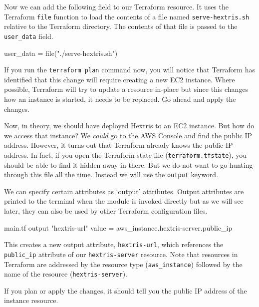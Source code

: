 \documentclass{csse4400}
\begin{document}


Now we can add the following field to our Terraform resource.
It uses the Terraform \texttt{file} function to load the contents of a file named \texttt{serve-hextris.sh} relative to the Terraform directory.
The contents of that file is passed to the \texttt{user\_data} field.

\begin{code}[language=terraform,numbers=none]{}
user_data = file("./serve-hextris.sh")
\end{code}

If you run the \texttt{terraform plan} command now,
you will notice that Terraform has identified that this change will require creating a new EC2 instance.
Where possible, Terraform will try to update a resource in-place but since this changes how an instance is started, it needs to be replaced.
Go ahead and apply the changes.

Now, in theory, we should have deployed Hextris to an EC2 instance.
But how do we access that instance?
We \textsl{could} go to the AWS Console and find the public IP address.
However, it turns out that Terraform already knows the public IP address.
In fact, if you open the Terraform state file (\texttt{terraform.tfstate}),
you should be able to find it hidden away in there.
But we do not want to go hunting through this file all the time.
Instead we will use the \texttt{output} keyword.

We can specify certain attributes as `output' attributes.
Output attributes are printed to the terminal when the module is invoked directly
but as we will see later, they can also be used by other Terraform configuration files.

\begin{code}[language=terraform,numbers=none]{main.tf}
output "hextris-url" {
  value = aws_instance.hextris-server.public_ip
}
\end{code}

This creates a new output attribute, \texttt{hextris-url},
which references the \texttt{public\_ip} attribute of our \texttt{hextris-server} resource.
Note that resources in Terraform are addressed by the resource type (\texttt{aws\_instance})
followed by the name of the resource (\texttt{hextris-server}).

If you plan or apply the changes, it should tell you the public IP address of the instance resource.
\end{document}
